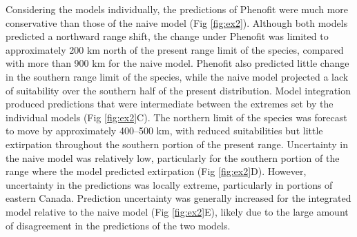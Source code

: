\documentclass[11pt]{article}
\begin{document}
Considering the models individually, the predictions of Phenofit were much more conservative than those of the naive model (Fig \ref{fig:ex2}).
Although both models predicted a northward range shift, the change under Phenofit was limited to approximately 200 km north of the present range limit of the species, compared with more than 900 km for the naive model.
Phenofit also predicted little change in the southern range limit of the species, while the naive model projected a lack of suitability over the southern half of the present distribution.
Model integration produced predictions that were intermediate between the extremes set by the individual models (Fig \ref{fig:ex2}C).
The northern limit of the species was forecast to move by approximately 400--500 km, with reduced suitabilities but little extirpation throughout the southern portion of the present range.
Uncertainty in the naive model was relatively low, particularly for the southern portion of the range where the model predicted extirpation (Fig \ref{fig:ex2}D).
However, uncertainty in the predictions was locally extreme, particularly in portions of eastern Canada.
Prediction uncertainty was generally increased for the integrated model relative to the naive model (Fig \ref{fig:ex2}E), likely due to the large amount of disagreement in the predictions of the two models.
\end{document}
